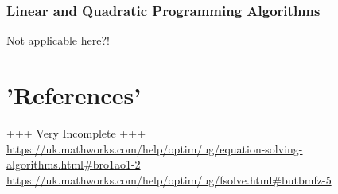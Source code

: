 \documentclass[11pt, a4paper]{article}
\theoremstyle{definition}
\begin{document}
\subsubsection{Linear and Quadratic Programming Algorithms}
Not applicable here?!










\section*{'References'}
+++ Very Incomplete +++
\url{https://uk.mathworks.com/help/optim/ug/equation-solving-algorithms.html#bro1ao1-2}\\
\url{https://uk.mathworks.com/help/optim/ug/fsolve.html#butbmfz-5}
\end{document}
